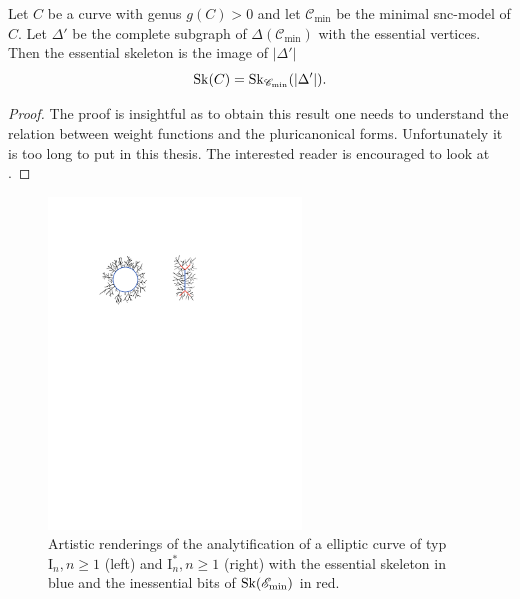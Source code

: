 \begin{theorem}
	Let $C$ be a curve with genus $g(C) > 0$ and let $\mathscr C_\text{min} $ be the minimal snc-model of $C$. 
	Let $\Delta'$ be the complete subgraph of $\Delta(\mathscr C_\text{min} )$ with the essential vertices. 
	Then the essential skeleton is the image of $|\Delta'|$\[
		\operatorname{Sk}(C) = \operatorname{Sk}_{\mathscr C_\text{min} }(|\Delta'|)
	.\] 
\end{theorem}
\begin{proof}
	The proof is insightful as to obtain this result one needs to understand the relation between weight functions and the pluricanonical forms.
	Unfortunately it is too long to put in this thesis. 
	The interested reader is encouraged to look at \cite[thm 3.3.13]{bakerWeightFunctionsBerkovich2016}. 
\end{proof}
\begin{figure}[h]
	\centering
	\includegraphics[width=0.6\textwidth]{chapters/weight/figures/essential_skeleton_elliptic.pdf}
	\caption{Artistic renderings of the analytification of a elliptic curve of typ $\mathrm I_n, n \ge 1$ (left) and $\mathrm I_n^*, n \ge 1$ (right) with the essential skeleton in blue and the inessential bits of  $\operatorname{Sk}(\mathscr E_\text{min} )$ in red. }
	\label{fig:}
\end{figure}

